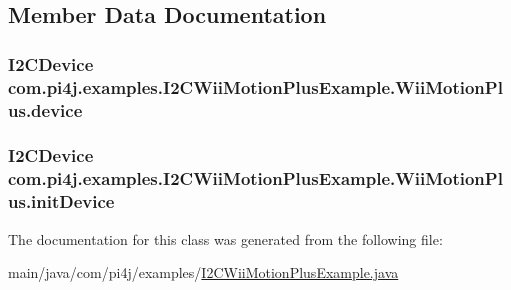 \subsection{Member Data Documentation}
\hypertarget{classcom_1_1pi4j_1_1examples_1_1I2CWiiMotionPlusExample_1_1WiiMotionPlus_a5785ab1b5e1108c36e1286c489a3684b}{}
\subsubsection[{device}]{\setlength{\rightskip}{0pt plus 5cm}I2\+C\+Device com.\+pi4j.\+examples.\+I2\+C\+Wii\+Motion\+Plus\+Example.\+Wii\+Motion\+Plus.\+device\hspace{0.3cm}{\ttfamily [private]}}\label{classcom_1_1pi4j_1_1examples_1_1I2CWiiMotionPlusExample_1_1WiiMotionPlus_a5785ab1b5e1108c36e1286c489a3684b}
\hypertarget{classcom_1_1pi4j_1_1examples_1_1I2CWiiMotionPlusExample_1_1WiiMotionPlus_a8caa866617964bc9c0f60980d8f5ddec}{}
\subsubsection[{init\+Device}]{\setlength{\rightskip}{0pt plus 5cm}I2\+C\+Device com.\+pi4j.\+examples.\+I2\+C\+Wii\+Motion\+Plus\+Example.\+Wii\+Motion\+Plus.\+init\+Device\hspace{0.3cm}{\ttfamily [private]}}\label{classcom_1_1pi4j_1_1examples_1_1I2CWiiMotionPlusExample_1_1WiiMotionPlus_a8caa866617964bc9c0f60980d8f5ddec}


The documentation for this class was generated from the following file\+:\begin{DoxyCompactItemize}
\item 
main/java/com/pi4j/examples/\hyperlink{I2CWiiMotionPlusExample_8java}{I2\+C\+Wii\+Motion\+Plus\+Example.\+java}\end{DoxyCompactItemize}
